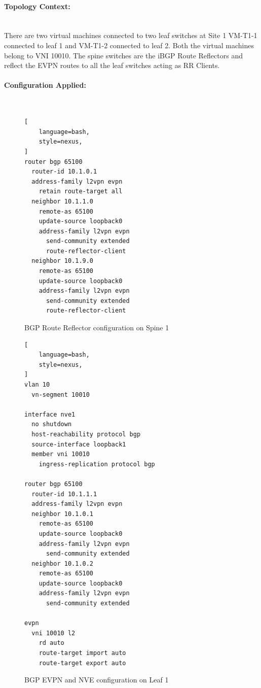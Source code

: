 \paragraph{Topology Context:}~\\
There are two virtual machines connected to two leaf switches at Site 1 VM-T1-1 connected to leaf 1 and VM-T1-2 connected to leaf 2. Both the virtual machines belong to VNI 10010. The spine switches are the iBGP Route Reflectors and reflect the EVPN routes to all the leaf switches acting as RR Clients.

\paragraph{Configuration Applied:}~\\
\begin{figure}[!htbp]
\centering
\begin{lstlisting}[
    language=bash,
    style=nexus,
]
router bgp 65100
  router-id 10.1.0.1
  address-family l2vpn evpn
    retain route-target all
  neighbor 10.1.1.0
    remote-as 65100
    update-source loopback0
    address-family l2vpn evpn
      send-community extended
      route-reflector-client
  neighbor 10.1.9.0
    remote-as 65100
    update-source loopback0
    address-family l2vpn evpn
      send-community extended
      route-reflector-client
\end{lstlisting}
\caption{BGP Route Reflector configuration on Spine 1}
\label{fig:scenario2-bgp-rr}
\end{figure}

\begin{figure}[!htbp]
\centering
\begin{lstlisting}[
    language=bash,
    style=nexus,
]
vlan 10
  vn-segment 10010

interface nve1
  no shutdown
  host-reachability protocol bgp
  source-interface loopback1
  member vni 10010
    ingress-replication protocol bgp

router bgp 65100
  router-id 10.1.1.1
  address-family l2vpn evpn
  neighbor 10.1.0.1
    remote-as 65100
    update-source loopback0
    address-family l2vpn evpn
      send-community extended
  neighbor 10.1.0.2
    remote-as 65100
    update-source loopback0
    address-family l2vpn evpn
      send-community extended

evpn
  vni 10010 l2
    rd auto
    route-target import auto
    route-target export auto
\end{lstlisting}
\caption{BGP EVPN and NVE configuration on Leaf 1}
\label{fig:scenario2-bgp-evpn-nve}
\end{figure}

